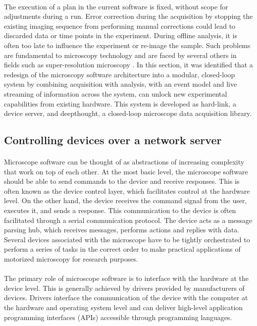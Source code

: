 \paragraph*{} The execution of a plan in the current software is fixed, without scope for adjustments during a run. Error correction during the acquisition by stopping the existing imaging sequence from performing manual corrections could lead to discarded data or time points in the experiment. During offline analysis, it is often too late to influence the experiment or re-image the sample. Such problems are fundamental to microscopy technology and are faced by several others in fields such as super-resolution microscopy \cite{D1SC05506B}. In this section, it was identified that a redesign of the microscopy software architecture into a modular, closed-loop system by combining acquisition with analysis, with an event model and live streaming of information across the system, can unlock new experimental capabilities from existing hardware. This system is developed as hard-link, a device server, and deepthought, a closed-loop microscope data acquisition library.


\subsection{Controlling devices over a network server}
\paragraph*{} Microscope software can be thought of as abstractions of increasing complexity that work on top of each other. At the most basic level, the microscope software should be able to send commands to the device and receive responses. This is often known as the device control layer, which facilitates control at the hardware level. On the other hand, the device receives the command signal from the user, executes it, and sends a response. This communication to the device is often facilitated through a serial communication protocol. The device acts as a message parsing hub, which receives messages, performs actions and replies with data. Several devices associated with the microscope have to be tightly orchestrated to perform a series of tasks in the correct order to make practical applications of motorized microscopy for research purposes.

\paragraph*{} The primary role of microscope software is to interface with the hardware at the device level. This is generally achieved by drivers provided by manufacturers of devices. Drivers interface the communication of the device with the computer at the hardware and operating system level and can deliver high-level application programming interfaces (APIs) accessible through programming languages.

